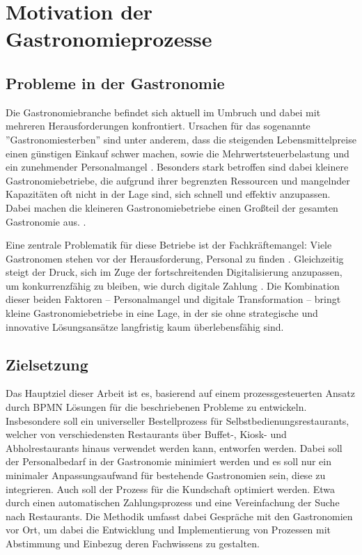 \section{Motivation der Gastronomieprozesse}
\label{sec:motivation_gastronomie}
\subsection{Probleme in der Gastronomie}
Die Gastronomiebranche befindet sich aktuell im Umbruch und dabei mit mehreren Herausforderungen konfrontiert. Ursachen für das sogenannte ''Gastronomiesterben'' sind unter anderem, dass die steigenden Lebensmittelpreise einen günstigen Einkauf schwer machen, sowie die Mehrwertsteuerbelastung und ein zunehmender Personalmangel \citep[vgl.][]{graefe_systemgastronomie_2018} \citep[vgl.][]{graefe_catering_2017}. Besonders stark betroffen sind dabei kleinere Gastronomiebetriebe, die aufgrund ihrer begrenzten Ressourcen und mangelnder Kapazitäten oft nicht in der Lage sind, sich schnell und effektiv anzupassen. \citep[vgl.][]{graefe_themenseite_2024} Dabei machen die kleineren Gastronomiebetriebe einen Großteil der gesamten Gastronomie aus. \citep[vgl.][]{gruner_deutsche_2016}. 

Eine zentrale Problematik für diese Betriebe ist der Fachkräftemangel: Viele Gastronomen stehen vor der Herausforderung, Personal zu finden \citep[vgl.][]{graefe_systemgastronomie_2018}. Gleichzeitig steigt der Druck, sich im Zuge der fortschreitenden Digitalisierung anzupassen, um konkurrenzfähig zu bleiben, wie durch digitale Zahlung \citep[vgl.][]{graefe_themenseite_2024}. Die Kombination dieser beiden Faktoren – Personalmangel und digitale Transformation – bringt kleine Gastronomiebetriebe in eine Lage, in der sie ohne strategische und innovative Lösungsansätze langfristig kaum überlebensfähig sind.

\subsection{Zielsetzung}
Das Hauptziel dieser Arbeit ist es, basierend auf einem prozessgesteuerten Ansatz durch BPMN Lösungen für die beschriebenen Probleme zu entwickeln.
Insbesondere soll ein universeller Bestellprozess für Selbstbedienungsrestaurants, welcher von verschiedensten Restaurants über Buffet-, Kiosk- und Abholrestaurants hinaus verwendet werden kann, entworfen werden. Dabei soll der Personalbedarf in der Gastronomie minimiert werden und es soll nur ein minimaler Anpassungsaufwand für bestehende Gastronomien sein, diese zu integrieren.
Auch soll der Prozess für die Kundschaft optimiert werden. Etwa durch einen automatischen Zahlungsprozess und eine Vereinfachung der Suche nach Restaurants.
Die Methodik umfasst dabei Gespräche mit den Gastronomien vor Ort, um dabei die Entwicklung und Implementierung von Prozessen mit Abstimmung und Einbezug deren Fachwissens zu gestalten.

